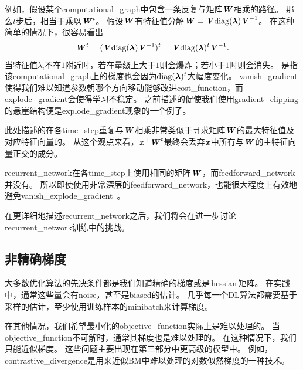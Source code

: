 
例如，假设某个\gls{computational_graph}中包含一条反复与矩阵$\boldsymbol{\mathit{W}}$相乘的路径。
那么$t$步后，相当于乘以$\boldsymbol{\mathit{W}}^t$。
假设$\boldsymbol{\mathit{W}}$有特征值分解$\boldsymbol{\mathit{W}} = \boldsymbol{\mathit{V}} \text{diag}(\boldsymbol{\lambda}) \boldsymbol{\mathit{V}}^{-1}$。
在这种简单的情况下，很容易看出
\begin{equation}
  \boldsymbol{\mathit{W}}^t = (\boldsymbol{\mathit{V}} \text{diag}(\boldsymbol{\lambda}) \boldsymbol{\mathit{V}}^{-1})^t = \boldsymbol{\mathit{V}}\text{diag}(\boldsymbol{\lambda})^t  \boldsymbol{\mathit{V}}^{-1}.
\end{equation}
当特征值$\lambda_i$不在$1$附近时，若在量级上大于$1$则会爆炸；若小于$1$时则会消失。
是指该\gls{computational_graph}上的梯度也会因为$\text{diag}(\boldsymbol{\lambda})^t$大幅度变化。
\gls{vanish_gradient}使得我们难以知道参数朝哪个方向移动能够改进\gls{cost_function}，而\gls{explode_gradient}会使得学习不稳定。
之前描述的促使我们使用\gls{gradient_clipping}的悬崖结构便是\gls{explode_gradient}现象的一个例子。


此处描述的在各\gls{time_step}重复与$\boldsymbol{\mathit{W}}$相乘非常类似于寻求矩阵$\boldsymbol{\mathit{W}}$的最大特征值及对应特征向量的。
从这个观点来看，$\boldsymbol{\mathit{x}}^\top\boldsymbol{\mathit{W}}^t$最终会丢弃$\boldsymbol{\mathit{x}}$中所有与$\boldsymbol{\mathit{W}}$的主特征向量正交的成分。


\gls{recurrent_network}在各\gls{time_step}上使用相同的矩阵$\boldsymbol{\mathit{W}}$，而\gls{feedforward_network}并没有。
所以即使使用非常深层的\gls{feedforward_network}，也能很大程度上有效地避免\gls{vanish_explode_gradient}~\citep{Sussillo14}。


在更详细地描述\gls{recurrent_network}之后，我们将会在进一步讨论\gls{recurrent_network}训练中的挑战。


\subsection{非精确梯度}
\label{sec:inexact_gradients}
大多数优化算法的先决条件都是我们知道精确的梯度或是\,\gls{hessian}\,矩阵。
在实践中，通常这些量会有\gls{noise}，甚至是\gls{biased}的估计。
几乎每一个\gls{DL}算法都需要基于采样的估计，至少使用训练样本的\gls{minibatch}来计算梯度。


在其他情况，我们希望最小化的\gls{objective_function}实际上是难以处理的。
当\gls{objective_function}不可解时，通常其梯度也是难以处理的。
在这种情况下，我们只能近似梯度。
这些问题主要出现在第三部分中更高级的模型中。
例如，\gls{contrastive_divergence}是用来近似\gls{BM}中难以处理的对数似然梯度的一种技术。

